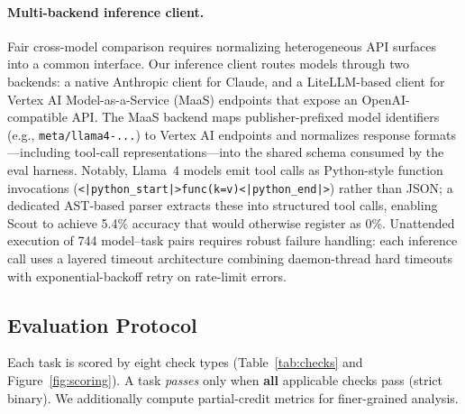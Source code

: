 \documentclass[10pt,twocolumn]{article}
\begin{document}
\paragraph{Multi-backend inference client.}
Fair cross-model comparison requires normalizing heterogeneous API surfaces into a common interface. Our inference client routes models through two backends: a native Anthropic client for Claude, and a LiteLLM-based client for Vertex AI Model-as-a-Service (MaaS) endpoints that expose an OpenAI-compatible API. The MaaS backend maps publisher-prefixed model identifiers (e.g., \texttt{meta/llama4-...}) to Vertex AI endpoints and normalizes response formats---including tool-call representations---into the shared schema consumed by the eval harness. Notably, Llama~4 models emit tool calls as Python-style function invocations (\texttt{<|python\_start|>func(k=v)<|python\_end|>}) rather than JSON; a dedicated AST-based parser extracts these into structured tool calls, enabling Scout to achieve 5.4\% accuracy that would otherwise register as 0\%. Unattended execution of 744 model--task pairs requires robust failure handling: each inference call uses a layered timeout architecture combining daemon-thread hard timeouts with exponential-backoff retry on rate-limit errors.

\subsection{Evaluation Protocol}
\label{sec:scoring}

Each task is scored by eight check types (Table~\ref{tab:checks} and Figure~\ref{fig:scoring}). A task \emph{passes} only when \textbf{all} applicable checks pass (strict binary). We additionally compute partial-credit metrics for finer-grained analysis.
\end{document}
